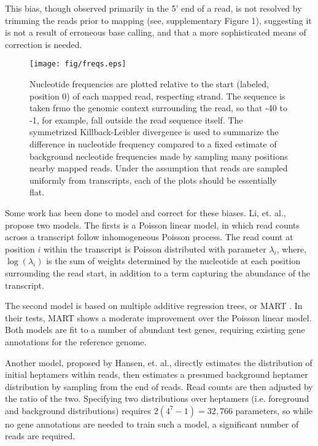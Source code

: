 \documentclass{bioinfo}
\begin{document}
This bias, though observed primarily in the 5' end of a read, is not resolved by
trimming the reads prior to mapping (see, supplementary Figure 1), suggesting
it is not a result of erroneous base calling, and that a more sophisticated
means of correction is needed.

\begin{figure*}
\centerline{\texttt{[image: fig/freqs.eps]}}
\caption{Nucleotide frequencies are plotted relative to the start (labeled,
position 0) of each mapped read, respecting strand. The sequence is taken frmo
the genomic context surrounding the read, so that -40 to -1, for example, fall
outside the read sequence itself. The symmetrized Killback-Leibler divergence is
used to summarize the difference in nucleotide frequency compared to a fixed
estimate of background necleotide frequencies made by sampling many positions
nearby mapped reads.  Under the assumption that reads are sampled uniformly from
transcripts, each of the plots should be essentially flat.}
\label{fig:freqs}
\end{figure*}


Some work has been done to model and correct for these biases.  Li, et. al.,
\cite{Li2010} propose two models. The firsts is a Poisson linear model, in which
read counts across a transcript follow inhomogeneous Poisson process. The read
count at position $i$ within the transcript is Poisson distributed with
parameter $\lambda_i$, where, $\log(\lambda_i)$ is the sum of weights determined by the
nucleotide at each position surrounding the read start, in addition to a term
capturing the abundance of the transcript.

The second model is based on multiple additive regression trees, or MART
\cite{Friedman2003}.  In their tests, MART shows a moderate improvement over the
Poisson linear model. Both models are fit to a number of abundant test genes,
requiring existing gene annotations for the reference genome. 

Another model, proposed by Hansen, et. al., \cite{Hansen2010} directly estimates
the distribution of initial heptamers within reads, then estimates a presumed
background heptamer distribution by sampling from the end of reads. Read counts
are then adjusted by the ratio of the two. Specifying two distributions over
heptamers (i.e. foreground and background distributions) requires $2(4^7-1) =
32,766$ parameters, so while no gene annotations are needed to train such a
model, a significant number of reads are required.
\end{document}
